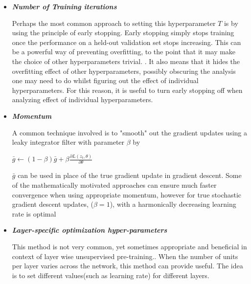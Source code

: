 \documentclass[twoside]{article}
\begin{document}
\begin{itemize}
 
\item \textit{\textbf{Number of Training iterations}}

Perhaps the most common approach to setting this hyperparameter $T$ is by using the principle of early stopping. Early stopping simply stops training once the performance on a held-out validation set stops increasing. This can be a powerful way of preventing overfitting, to the point that it may make the choice of other hyperparameters trivial. \cite{bengio2012practical}. It also means that it hides the overfitting effect of other hyperparameters, possibly obscuring the analysis one may need to do whilst figuring out the effect of individual hyperparameters. For this reason, it is useful to turn early stopping off when analyzing effect of individual hyperparameters. \cite{bengio2012practical}
\item \textit{\textbf{Momentum}}

A common technique involved is to "smooth" out the gradient updates using a leaky integrator filter with parameter $\beta$ by 

$\bar{g} \leftarrow (1 - \beta)\bar{g} + \beta \frac{\partial L(z_t, \theta)}{\partial \theta}$

$\bar{g}$ can be used in place of the true gradient update in gradient descent. Some of the mathematically motivated approaches can ensure much faster convergence when using appropriate momentum, however for true stochastic gradient descent updates, ($\beta = 1$), with a harmonically decreasing learning rate is optimal \cite{bengio2012practical}


\item \textit{\textbf{Layer-specific optimization hyper-parameters}}

This method is not very common, yet sometimes appropriate and beneficial in context of layer wise unsupervised pre-training.\cite{bengio2012practical}. When the number of units per layer varies across the network, this method can provide useful. The idea is to set different values(such as learning rate) for different layers. 

\end{itemize}
\end{document}

